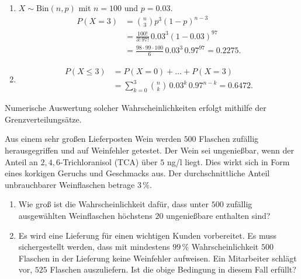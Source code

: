 \solution 
\begin{enumerate}
    \item $X\sim \text{Bin}(n, p)$ mit $n=100$ und $p=0.03$. 
        \begin{align*}
            P(X=3) &= \binom{n}{3} p^{3}(1-p)^{n-3} \\
            &= \frac{100!}{3!\, 97!}\, {0.03}^{3}\left( 1-0.03 \right)^{97} \\
            &= \frac{98\cdot 99\cdot 100}{ 6}\, {0.03}^{3}\, {0.97}^{97} = 0.2275.
        \end{align*}
    \item \begin{align*}
            P(X\leq 3) &= P(X=0)+\dots+P(X=3) \\
            &= \sum_{k=0}^{3} \binom{n}{k}\, {0.03}^{k}\, {0.97}^{n-k} = 0.6472.
        \end{align*}
\end{enumerate}
Numerische Auswertung solcher Wahrscheinlichkeiten erfolgt mithilfe  der Grenzverteilungsätze.


 Aus einem sehr großen Lieferposten
Wein werden $500$ Flaschen zufällig herausgegriffen und auf Weinfehler
getestet. Der Wein sei ungenießbar, wenn der Anteil an $2,4,6$-Trichloranisol
(TCA) über $5$ ng/l liegt. Dies wirkt sich in Form eines korkigen Geruchs und
Geschmacks aus. Der durchschnittliche Anteil unbrauchbarer Weinflaschen betrage
$3\,\%$. 
\begin{enumerate}
    \item Wie groß ist die Wahrscheinlichkeit dafür, dass unter $500$ zufällig 
        ausgewählten Weinflaschen höchstens $20$ ungenießbare enthalten sind? 
    \item Es wird eine Lieferung für einen wichtigen Kunden vorbereitet. Es
        muss sichergestellt werden, dass mit mindestens $99\,\%$
        Wahrscheinlichkeit $500$ Flaschen in der Lieferung keine Weinfehler
        aufweisen. Ein Mitarbeiter schlägt vor, $525$ Flaschen auszuliefern.
        Ist die obige Bedingung in diesem Fall erfüllt?
        
\end{enumerate}

